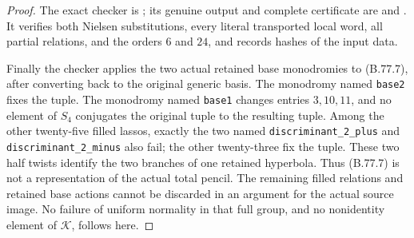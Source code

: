 \begin{proof}
The exact checker is
; its genuine
output and complete certificate are
 and
.
It verifies both Nielsen substitutions, every literal transported
local word, all partial relations, and the orders \(6\) and
\(24\), and records hashes of the input data.

Finally the checker applies the two actual retained base
monodromies to (B.77.7), after converting back to the original
generic basis. The monodromy named \texttt{base2} fixes the tuple.
The monodromy named \texttt{base1} changes entries \(3,10,11\),
and no element of \(S_4\) conjugates the original tuple to the
resulting tuple. Among the other twenty-five filled lassos, exactly the two named
\texttt{discriminant\_2\_plus} and
\texttt{discriminant\_2\_minus} also fail; the other twenty-three
fix the tuple. These two half twists identify the two branches of
one retained hyperbola. Thus (B.77.7) is not a representation of the
actual total pencil. The remaining filled relations and retained
base actions cannot be discarded in an argument for the actual
source image. No failure of uniform normality in that full group,
and no nonidentity element of \(\mathcal K\), follows here.
\end{proof}
